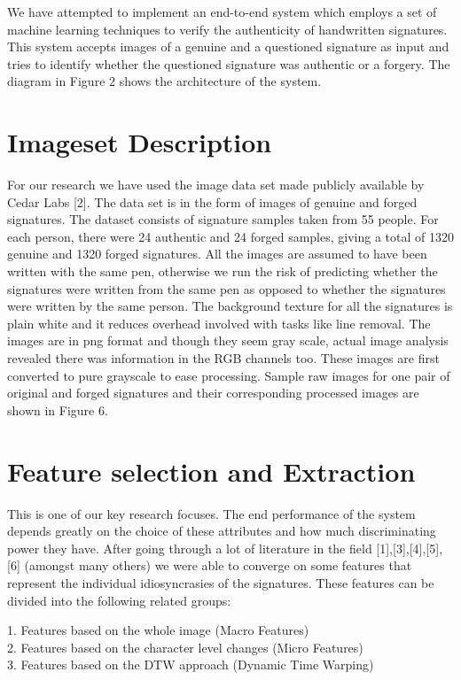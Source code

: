 \documentclass{article}
\begin{document}
We have attempted to implement an end-to-end system which employs a set of machine learning techniques to verify the authenticity of handwritten signatures. This system accepts images of a genuine and a questioned signature as input and tries to identify whether the questioned signature was authentic or a forgery. The diagram in Figure 2 shows the architecture of the system.

\section{Imageset Description}
For our research we have used the image data set made publicly available by Cedar Labs [2]. The data set is in the form of images of genuine and forged signatures. The dataset consists of signature samples taken from 55 people. For each person, there were 24 authentic and 24 forged samples, giving a total of 1320 genuine and 1320 forged signatures. All the images are assumed to have been written with the same pen, otherwise we run the risk of predicting whether the signatures were written from the same pen as opposed to whether the signatures were written by the same person. The background texture for all the signatures is plain white and it reduces overhead involved with tasks like line removal. The images are in png format and though they seem gray scale, actual image analysis revealed there was information in the RGB  channels too. These images are first converted to pure grayscale to ease processing.
Sample raw images for one pair of original and forged signatures and their corresponding processed images are shown in Figure 6.

\section{Feature selection and Extraction}
This is one of our key research focuses. The end performance of the system depends greatly on the choice of these attributes and how much discriminating power they have. After going through a lot of literature in the field [1],[3],[4],[5],[6] (amongst  many others) we were able to converge on some features that represent the individual idiosyncrasies of the signatures. These features can be divided into the following related groups:

1. Features based on the whole image (Macro Features)\\
2. Features based on the character level changes (Micro Features)\\
3. Features based on the DTW approach (Dynamic Time Warping)
\end{document}
